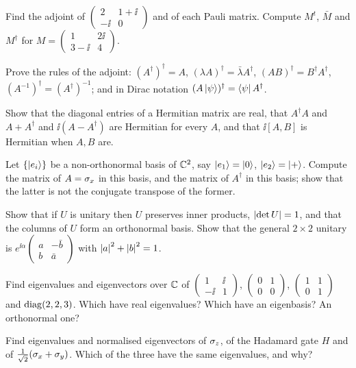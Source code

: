 \begin{exerciseset}
   Find the adjoint of $\begin{pmatrix}2&1+\ii\\-\ii&0\end{pmatrix}$ and of each Pauli matrix. Compute $M^t$, $\bar M$ and $M^\dagger$ for $M=\begin{pmatrix}1&2\ii\\3-\ii&4\end{pmatrix}$.

   Prove the rules of the adjoint: $(A^\dagger)^\dagger=A$, $(\lambda A)^\dagger=\bar\lambda A^\dagger$, $(AB)^\dagger=B^\dagger A^\dagger$, $(A^{-1})^\dagger=(A^\dagger)^{-1}$; and in Dirac notation $(A\left|\psi\right\rangle)^\dagger=\left\langle\psi\right| A^\dagger$.

   Show that the diagonal entries of a Hermitian matrix are real, that $A^\dagger A$ and $A+A^\dagger$ and $\ii(A-A^\dagger)$ are Hermitian for every $A$, and that $\ii[A,B]$ is Hermitian when $A,B$ are.

   Let $\{\left|e_i\right\rangle\}$ be a non-orthonormal basis of $\mathbb{C}^2$, say $\left|e_1\right\rangle=\left|0\right\rangle$, $\left|e_2\right\rangle=\left|+\right\rangle$. Compute the matrix of $A=\sigma_x$ in this basis, and the matrix of $A^\dagger$ in this basis; show that the latter is not the conjugate transpose of the former.

   Show that if $U$ is unitary then $U$ preserves inner products, $\left|\det U\right|=1$, and that the columns of $U$ form an orthonormal basis. Show that the general $2\times2$ unitary is $e^{\ii\alpha}\begin{pmatrix}a&-\bar b\\b&\bar a\end{pmatrix}$ with $\left|a\right|^2+\left|b\right|^2=1$.

   Find eigenvalues and eigenvectors over $\mathbb{C}$ of $\begin{pmatrix}1&\ii\\-\ii&1\end{pmatrix}$, $\begin{pmatrix}0&1\\0&0\end{pmatrix}$, $\begin{pmatrix}1&1\\0&1\end{pmatrix}$ and $\operatorname{diag}(2,2,3)$. Which have real eigenvalues? Which have an eigenbasis? An orthonormal one?

   Find eigenvalues and normalised eigenvectors of $\sigma_z$, of the Hadamard gate $H$ and of $\tfrac1{\sqrt2}(\sigma_x+\sigma_y)$. Which of the three have the same eigenvalues, and why?


\end{exerciseset}
